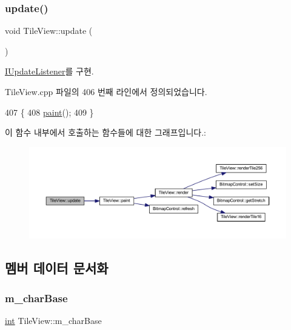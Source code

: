 \subsubsection{\texorpdfstring{update()}{update()}}
{\footnotesize\ttfamily void Tile\+View\+::update (\begin{DoxyParamCaption}{ }\end{DoxyParamCaption})\hspace{0.3cm}{\ttfamily [virtual]}}



\mbox{\hyperlink{class_i_update_listener_ac03b85f52e858d0bbd08a4984b2cb929}{I\+Update\+Listener}}를 구현.



Tile\+View.\+cpp 파일의 406 번째 라인에서 정의되었습니다.


\begin{DoxyCode}
407 \{
408   \mbox{\hyperlink{class_tile_view_a4341071a0cab0d5a8b6dfa7318230636}{paint}}();
409 \}
\end{DoxyCode}
이 함수 내부에서 호출하는 함수들에 대한 그래프입니다.\+:
\nopagebreak
\begin{figure}[H]
\begin{center}
\leavevmode
\includegraphics[width=350pt]{class_tile_view_a09b04d6b0135ef2b6da3c08796c1d354_cgraph}
\end{center}
\end{figure}


\subsection{멤버 데이터 문서화}
\mbox{\label{class_tile_view_a1fd549925ae533d9ce7215b8d5de4c63}} 
\subsubsection{\texorpdfstring{m\+\_\+char\+Base}{m\_charBase}}
{\footnotesize\ttfamily \mbox{\hyperlink{_util_8cpp_a0ef32aa8672df19503a49fab2d0c8071}{int}} Tile\+View\+::m\+\_\+char\+Base}



